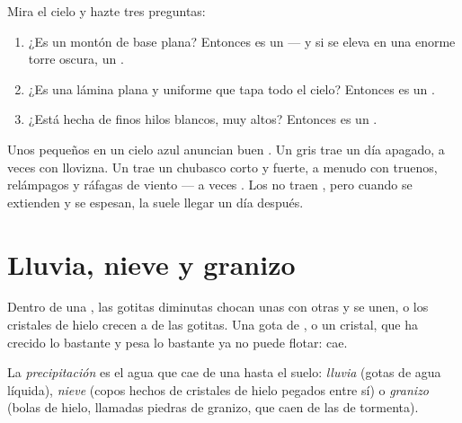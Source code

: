 \begin{method}\label{met:g4:clouds-rain-snow:naming}
Mira el cielo y hazte tres preguntas:
\begin{enumerate}
  \item ¿Es un montón de base plana? Entonces es un  --- y si se
        eleva en una enorme torre oscura, un .
  \item ¿Es una lámina plana y uniforme que tapa todo el cielo? Entonces es
        un .
  \item ¿Está hecha de finos hilos blancos, muy altos? Entonces es un .
\end{enumerate}
\end{method}

\begin{remark}\label{rem:g4:clouds-rain-snow:tell}
Unos  pequeños en un cielo azul anuncian buen . Un 
gris trae un día apagado, a veces con llovizna. Un  trae un
chubasco corto y fuerte, a menudo con truenos, relámpagos y ráfagas de
viento --- a veces . Los  no traen , pero cuando se
extienden y se espesan, la  suele llegar un día después.
\end{remark}

\section{Lluvia, nieve y granizo}

Dentro de una , las gotitas diminutas chocan unas con otras y se unen,
o los cristales de hielo crecen a  de las gotitas. Una gota de , o
un cristal, que ha crecido lo bastante y pesa lo bastante ya no puede
flotar: cae.

\begin{definition}[Precipitación]\label{def:g4:clouds-rain-snow:precipitation}
La \emph{precipitación} es el agua que
cae de una  hasta el suelo: \emph{lluvia} (gotas de agua
líquida), \emph{nieve} (copos hechos de cristales de hielo
pegados entre sí) o \emph{granizo} (bolas de hielo, llamadas
piedras de granizo, que caen de las  de tormenta).
\end{definition}


